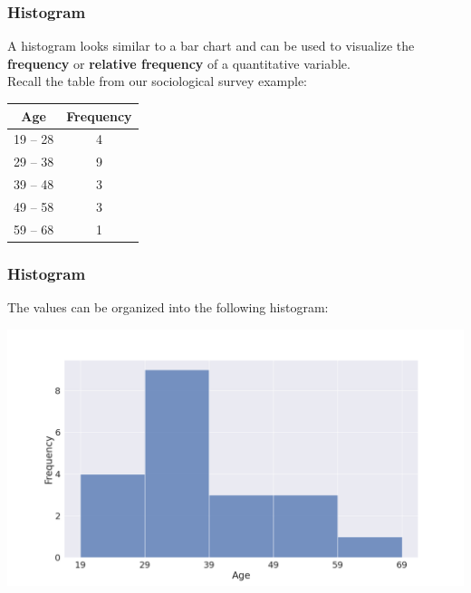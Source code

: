 \documentclass[aspectratio=169,11pt,svgnames]{beamer}
\begin{document}
\begin{frame}
 \frametitle{Histogram}
 A histogram looks similar to a bar chart and can be used to visualize the
 \textbf{frequency} or \textbf{relative frequency} of a \alert{quantitative
 variable}.\\
 \pause
 Recall the table from our sociological survey example:
 \begin{center}
  \begin{tabular}{c|c}
   \textbf{Age} & \textbf{Frequency}\\
   \toprule
   19 -- 28 & 4\\
   29 -- 38 & 9\\
   39 -- 48 & 3\\
   49 -- 58 & 3\\
   59 -- 68 & 1
  \end{tabular}
 \end{center}
\end{frame}

\begin{frame}
 \frametitle{Histogram}
 The values can be organized into the following histogram:
 \begin{center}
  \includegraphics[width=.7\textwidth]{survey_hist.png}
 \end{center}
\end{frame}
\end{document}
